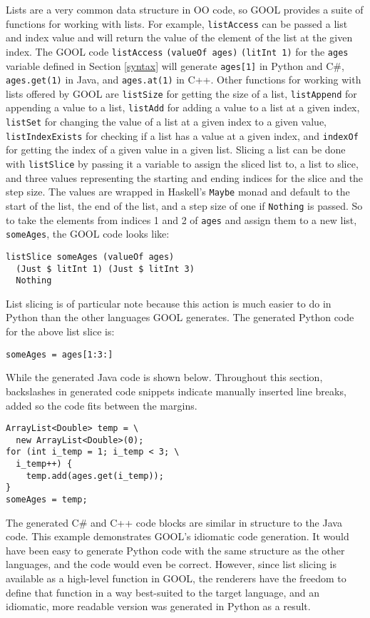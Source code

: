 \documentclass[sigplan,review,anonymous]{acmart}
\begin{document}
Lists are a very common data structure in OO code, so GOOL provides a suite of 
functions for working with lists. For example, \verb|listAccess| can be passed 
a list and index value and will return the value of the element of the list at 
the given index. The GOOL code \verb|listAccess| \verb|(valueOf ages)| 
\verb|(litInt 1)| for the \verb|ages| variable defined in Section \ref{syntax} 
will generate \verb|ages[1]| in Python and C\#, \verb|ages.get(1)| in Java, and 
\verb|ages.at(1)| in C++. Other functions for working with lists offered by 
GOOL are \verb|listSize| for getting the size of a list, \verb|listAppend| for 
appending a value to a list, \verb|listAdd| for adding a value to a list at a 
given index, \verb|listSet| for changing the value of a list at a given 
index to a given value, \verb|listIndexExists| for checking if a list has a 
value at a given index, and \verb|indexOf| for getting the index of a given 
value in a given list. Slicing a list can be done with \verb|listSlice| by 
passing it a variable to assign the sliced list to, a list to slice, and three 
values representing the starting and ending indices for the slice and the step 
size. The values are wrapped in Haskell's \verb|Maybe| monad and default to the 
start of the list, the end of the list, and a step size of one if 
\verb|Nothing| is passed. So to take the elements from indices 1 and 2 of 
\verb|ages| and assign them to a new list, \verb|someAges|, the GOOL code looks 
like:
\begin{lstlisting}
listSlice someAges (valueOf ages) 
  (Just $ litInt 1) (Just $ litInt 3) 
  Nothing
\end{lstlisting} 
List slicing is of particular note because this action is much easier to do in 
Python than the other languages GOOL generates. The generated Python code for 
the above list slice is:
\begin{lstlisting}
someAges = ages[1:3:]
\end{lstlisting}
While the generated Java code is shown below. Throughout this section, 
backslashes in generated code snippets indicate manually inserted line breaks, 
added so the code fits between the margins.
\begin{lstlisting}
ArrayList<Double> temp = \
  new ArrayList<Double>(0);
for (int i_temp = 1; i_temp < 3; \
  i_temp++) {
    temp.add(ages.get(i_temp));
}
someAges = temp;
\end{lstlisting}
The generated C\# and C++ code blocks are similar in structure to the Java 
code. This example demonstrates GOOL's idiomatic code generation. It would have 
been easy to generate Python code with the same structure as the other 
languages, and the code would even be correct. However, since list slicing is 
available as a high-level function in GOOL, the renderers have the freedom to 
define that function in a way best-suited to the target language, and an 
idiomatic, more readable version was generated in Python as a result.
\end{document}
